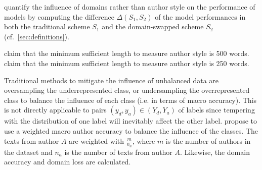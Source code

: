 \citet{bischoff_importance_2020} quantify the influence of domains rather than author style on the performance of models by 
computing the difference $\Delta(S_1,S_2)$ of the model performances in both the traditional scheme $S_1$ 
and the domain-swapped scheme $S_2$ (cf.~\autoref{sec:definitions}).

\citet{bischoff_importance_2020} claim that the minimum sufficient length to measure author style is 500 words.
\citet{abbasi_writeprints_2008} claim that the minimum sufficient length to measure author style is 250 words.

Traditional methods to mitigate the influence of unbalanced data are oversampling the underrepresented class, 
or undersampling the overrepresented class to balance the influence of each class (i.e. in terms of macro accuracy).
This is not directly applicable to pairs $(y_d, y_a) \in (Y_d, Y_a)$ of labels since tempering with the distribution 
of one label will inevitably affect the other label.
\citet{bischoff_importance_2020} propose to use a weighted macro author accuracy to balance the influence of the classes.
The texts from author $A$ are weighted with $\frac{m}{n_a}$, 
where $m$ is the number of authors in the dataset and $n_a$ is the number of texts from author $A$.
Likewise, the domain accuracy and domain loss are calculated.
